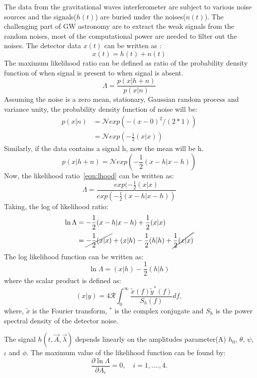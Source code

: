 \documentclass{ttuthes2007}
\begin{document}
The data from the gravitational waves interferometer are subject to various
noise sources and the signals($h(t)$) are buried under the noises($n(t)$). The challenging part
of \ac{GW} astronomy are to extract the weak signals from the random noises,
most of the computational power are needed to filter out the noises. The
detector data $x(t)$ can be written as :
\begin{equation}
x(t) = h(t)+n(t)
\end{equation}
The maximum likelihood ratio can be defined as ratio of the probability density function
of when signal is present to when signal is absent.
\begin{equation}\label{eqn:lhood}
\Lambda = \frac{p(x|h+n)}{p(x|n)}
\end{equation}
Assuming the noise is a zero mean, stationary, Gaussian random process and
variance unity, the probability density function of noise will be:
\begin{align*}
p(x|n) & = \mathcal{N}exp(-(x-0)^2/(2*1))\\
&= \mathcal{N}exp(-\frac{1}{2}(x|x))
\end{align*}
Similarly, if the data contains a signal h, now the mean will be h.
\begin{equation}
p(x|h+n)= \mathcal{N}exp(-\frac{1}{2}(x-h|x-h))
\end{equation}
Now, the likelihood ratio~\ref{eqn:lhood} can be written as:
\begin{equation}
\Lambda= \frac{exp(-\frac{1}{2}(x|x)}{exp(-\frac{1}{2}(x-h|x-h))}
\end{equation}
Taking, the log of likelihood ratio:
\begin{align*}
\ln{\Lambda} & =-\frac{1}{2}(x-h|x-h) + \frac{1}{2}(x|x)\\
& = \cancel{-\frac{1}{2}(x|x)} +(x|h)-\frac{1}{2}(h|h)+\cancel{\frac{1}{2}(x|x)}
\end{align*}
The log likelihood function can be written as:
\begin{equation}
\ln{\Lambda}=(x|h)-\frac{1}{2}(h|h)
\end{equation}
where the scalar product is defined as:
\begin{equation}
(x|y)=4\mathcal{R} \int_{0}^{\infty}\frac{\tilde{x}(f)\tilde{y}^*(f)}{S_h(f)}df, 
\end{equation}
where, $\tilde{x}$ is the Fourier transform, $^*$ is the complex conjugate and 
$S_h$ is the power spectral density of the detector noise.

The signal $h(t,\vec{A},\vec{\lambda})$ depends linearly on the amplitudes parameter(A)
$h_0$, $\theta$, $\psi$, $\iota$ and $\phi$. The maximum value of the likelihood
function can be found by:
\begin{equation}
\frac{\partial\ln\Lambda}{\partial A_i}= 0, \quad i=1,....,4.  
\end{equation}
\end{document}
